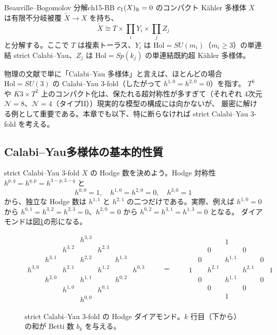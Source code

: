 \begin{mythm}{Beauville--Bogomolov 分解}{ch15-BB}
$c_1(X)_{\mathbb{R}} = 0$ のコンパクト K\"ahler 多様体 $X$ は有限不分岐被覆 $\tilde X\to X$ を持ち、
\[
\tilde X\cong T\times\prod_i Y_i\times\prod_j Z_j
\]
と分解する。ここで $T$ は複素トーラス、$Y_i$ は $\mathrm{Hol}=SU(m_i)$（$m_i\ge3$）の単連結 strict Calabi--Yau、$Z_j$ は $\mathrm{Hol} = Sp(k_j)$ の単連結既約超 K\"ahler 多様体。
\end{mythm}

\begin{physbox}[定義の流儀]
物理の文献で単に「Calabi--Yau 多様体」と言えば、ほとんどの場合 $\mathrm{Hol} = SU(3)$ の Calabi--Yau 3-fold（したがって $h^{1,0} = h^{2,0} = 0$）を指す。
$T^6$ や $K3\times T^2$ 上のコンパクト化は、保たれる超対称性が多すぎて（それぞれ 4次元 $\mathcal N=8$、$\mathcal N=4$（タイプII））現実的な模型の構成には向かないが、
厳密に解ける例として重要である。本章でも以下、特に断らなければ strict Calabi--Yau 3-fold を考える。
\end{physbox}

\subsection{Calabi--Yau多様体の基本的性質}

strict Calabi--Yau 3-fold $X$ の Hodge 数を決めよう。Hodge 対称性 $h^{p,q} = h^{q,p} = h^{3-p,3-q}$ と
\[
h^{0,0} = 1,\quad h^{1,0} = h^{2,0} = 0,\quad h^{3,0} = 1
\]
から、独立な Hodge 数は $h^{1,1}$ と $h^{2,1}$ の二つだけである。実際、例えば $h^{1,0}=0$ から $h^{0,1}=h^{3,2}=h^{2,3}=0$、$h^{2,0}=0$ から $h^{0,2}=h^{3,1}=h^{1,3}=0$ となる。
ダイアモンドは図\ref{fig:ch15-hodge-cy3}の形になる。

\begin{figure}[H]
\centering
\setlength{\arraycolsep}{2.5pt}
\[
\begin{array}{ccccccc}
 & & & h^{3,3} & & & \\
 & & h^{3,2} & & h^{2,3} & & \\
 & h^{3,1} & & h^{2,2} & & h^{1,3} & \\
h^{3,0} & & h^{2,1} & & h^{1,2} & & h^{0,3}\\
 & h^{2,0} & & h^{1,1} & & h^{0,2} & \\
 & & h^{1,0} & & h^{0,1} & & \\
 & & & h^{0,0} & & &
\end{array}
\qquad = \qquad
\begin{array}{ccccccc}
 & & & 1 & & & \\
 & & 0 & & 0 & & \\
 & 0 & & h^{1,1} & & 0 & \\
1 & & h^{2,1} & & h^{2,1} & & 1\\
 & 0 & & h^{1,1} & & 0 & \\
 & & 0 & & 0 & & \\
 & & & 1 & & &
\end{array}
\]
\caption{strict Calabi--Yau 3-fold の Hodge ダイアモンド。$k$ 行目（下から）の和が Betti 数 $b_k$ を与える。}
\label{fig:ch15-hodge-cy3}
\end{figure}

